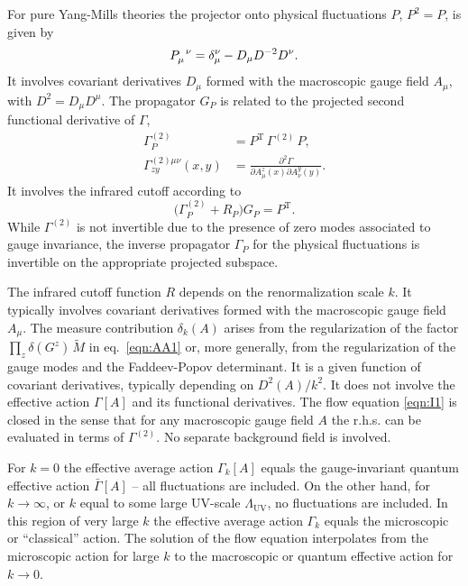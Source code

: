 \documentclass[twocolumn,aps,prd,amsmath,amssymb,preprintnumbers,longbibliography]{revtex4-1}
\numberwithin{equation}{section}
\newcommand{\transp}{\mathrm{T}}
\newenvironment{alignedeqn}{\begin{equation}\begin{aligned}}{\end{aligned}\end{equation}\ignorespacesafterend}
\begin{document}
For pure Yang-Mills theories the projector onto physical fluctuations $P$, $P^2 = P$, is given by
\begin{equation}\label{eqn:228A}
	\tensor{P}{_\mu^\nu}
	= \delta^\nu_\mu-D_\mu D^{-2}D^\nu.
\end{equation}
It involves covariant derivatives $D_\mu$ formed with the macroscopic gauge field $A_\mu$, with $D^2 = D_\mu D^\mu$. The propagator $G_P$ is related to the projected second functional derivative of $\Gamma$,
\begin{alignedeqn}\label{eqn:I5}
	\Gamma^{(2)}_P
	&= P^\transp \, \Gamma^{(2)} \, P,\\
	\Gamma^{(2)\mu\nu}_{zy}(x,y)
	&= \frac{\partial^2\Gamma}{\partial A^z_\mu(x)\partial A^y_\nu(y)}.
\end{alignedeqn}
It involves the infrared cutoff according to
\begin{equation}\label{eqn:I6}
	\bigl(\Gamma_P^{(2)} + R_P\bigr) G_P
	= P^\transp.
\end{equation}
While $\Gamma^{(2)}$ is not invertible due to the presence of zero modes associated to gauge invariance, the inverse propagator $\Gamma_P$ for the physical fluctuations is invertible on the appropriate projected subspace.

The infrared cutoff function $R$ depends on the renormalization scale $k$. It typically involves covariant derivatives formed with the macroscopic gauge field $A_\mu$. The measure contribution $\delta_k(A)$ arises from the regularization of the factor $\prod_z \delta(G^z) \, \tilde{M}$ in eq.~\eqref{eqn:AA1} or, more generally, from the regularization of the gauge modes and the Faddeev-Popov determinant. It is a given function of covariant derivatives, typically depending on $D^2(A)/k^2$. It does not involve the effective action $\Gamma[A]$ and its functional derivatives. The flow equation \eqref{eqn:I1} is closed in the sense that for any macroscopic gauge field $A$ the r.h.s. can be evaluated in terms of $\Gamma^{(2)}$. No separate background field is involved.

For $k = 0$ the effective average action $\Gamma_k[A]$ equals the gauge-invariant quantum effective action $\bar\Gamma[A]$ -- all fluctuations are included. On the other hand, for $k \to \infty$, or $k$ equal to some large UV-scale $\Lambda_\text{UV}$, no fluctuations are included. In this region of very large $k$ the effective average action $\Gamma_k$ equals the microscopic or ``classical'' action. The solution of the flow equation interpolates from the microscopic action for large $k$ to the macroscopic or quantum effective action for $k \to 0$.
\end{document}
